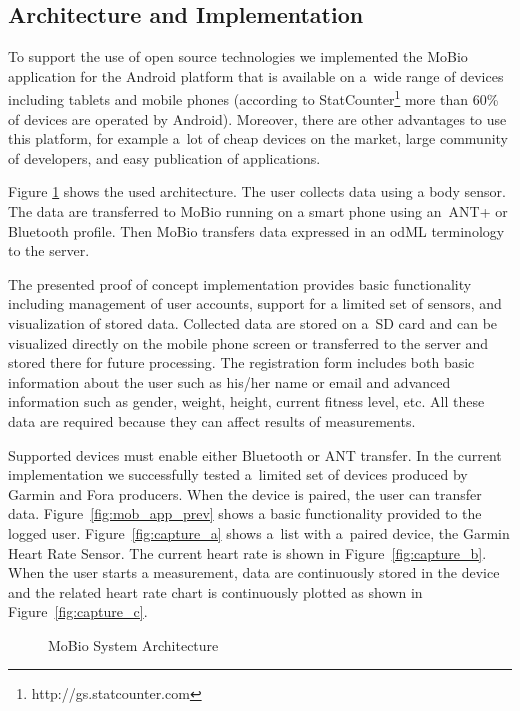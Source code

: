 \documentclass[a4paper,twoside]{article}
\begin{document}
\subsection{Architecture and Implementation}

To support the use of open source technologies we implemented the MoBio application for the Android platform that is available on a~wide range of devices including tablets and mobile phones  (according to StatCounter\footnote{http://gs.statcounter.com} more than 60\% of devices are operated by Android). Moreover, there are other advantages to use this platform, for example a~lot of cheap devices on the market, large community of developers, and easy publication of applications.

Figure \ref{fig:Architecture} shows the used architecture. The user collects data using a body sensor. The data are transferred to MoBio running on a smart phone using an~ANT+ or Bluetooth profile. Then MoBio transfers data expressed in an odML terminology to the server.

The presented proof of concept implementation provides basic functionality including management of user accounts, support for a limited set of sensors, and visualization of stored data. Collected data are stored on a~SD card and can be visualized directly on the mobile phone screen or transferred to the server and stored there for future processing. The registration form includes both basic information about the user such as his/her name or email and advanced information such as gender, weight, height, current fitness level, etc. All these data are required because they can affect results of measurements.

Supported devices must enable either Bluetooth or ANT transfer. In the current implementation we successfully tested a~limited set of devices produced by Garmin and Fora producers. When the device is paired, the user can transfer data. Figure~\ref{fig:mob_app_prev} shows a basic functionality provided to the logged user. Figure~\ref{fig:capture_a} shows a~list with a~paired device, the Garmin Heart Rate Sensor. The current heart rate is shown in Figure~\ref{fig:capture_b}. When the user starts a measurement, data are continuously stored in the device and the related heart rate chart is continuously plotted as shown in Figure~\ref{fig:capture_c}.

 \begin{figure}

  \centering
   {}
  \caption{MoBio System Architecture}
  \label{fig:Architecture}
 \end{figure}
\end{document}
